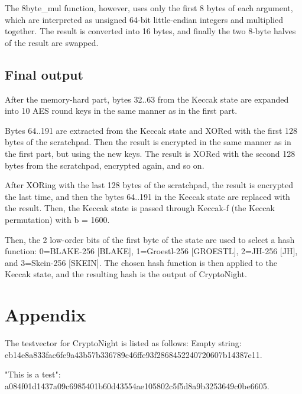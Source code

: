 \documentclass{article}
\begin{document}
   The 8byte_mul function, however, uses only the first 8 bytes of each
   argument, which are interpreted as unsigned 64-bit little-endian
   integers and multiplied together. The result is converted into 16
   bytes, and finally the two 8-byte halves of the result are swapped.


 \subsection{Final output}
 After the memory-hard part, bytes 32..63 from the Keccak state are
   expanded into 10 AES round keys in the same manner as in the first
   part.

   Bytes 64..191 are extracted from the Keccak state and XORed with the
   first 128 bytes of the scratchpad. Then the result is encrypted in
   the same manner as in the first part, but using the new keys. The
   result is XORed with the second 128 bytes from the scratchpad,
   encrypted again, and so on. 

   After XORing with the last 128 bytes of the scratchpad, the result is
   encrypted the last time, and then the bytes 64..191 in the Keccak
   state are replaced with the result. Then, the Keccak state is passed
   through Keccak-f (the Keccak permutation) with b = 1600. 

   Then, the 2 low-order bits of the first byte of the state are used to
   select a hash function: 0=BLAKE-256 [BLAKE], 1=Groestl-256 [GROESTL],
   2=JH-256 [JH], and 3=Skein-256 [SKEIN]. The chosen hash function is
   then applied to the Keccak state, and the resulting hash is the
   output of CryptoNight.

\section{Appendix}
The testvector for CryptoNight is listed as follows:
      Empty string:
      eb14e8a833fac6fe9a43b57b336789c46ffe93f2868452240720607b14387e11.

      "This is a test":
      a084f01d1437a09c6985401b60d43554ae105802c5f5d8a9b3253649c0be6605.
\end{document}
